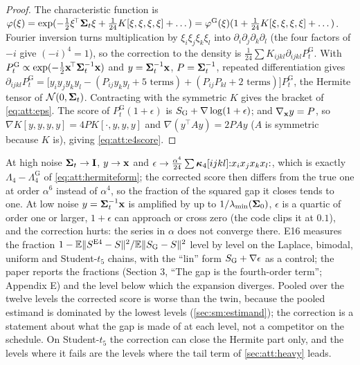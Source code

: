 \begin{proof}
The characteristic function is $\varphi(\xi)=\exp(-\tfrac12\xi^{\!\top}\mathbf{\Sigma}_t\xi+\tfrac1{24}K[\xi,\xi,\xi,\xi]+\dots)=\varphi^{\mathrm G}(\xi)(1+\tfrac1{24}K[\xi,\xi,\xi,\xi]+\dots)$.
Fourier inversion turns multiplication by $\xi_i\xi_j\xi_k\xi_l$ into
$\partial_i\partial_j\partial_k\partial_l$ (the four factors of $-i$ give $(-i)^4=1$), so
the correction to the density is $\tfrac1{24}\sum K_{ijkl}\partial_{ijkl}P^{\mathrm G}_t$.
With $P^{\mathrm G}_t\propto\exp(-\tfrac12\mathbf{x}^{\!\top}\mathbf{\Sigma}_t^{-1}\mathbf{x})$ and $y=\mathbf{\Sigma}_t^{-1}\mathbf{x}$,
$P=\mathbf{\Sigma}_t^{-1}$, repeated differentiation gives
$\partial_{ijkl}P^{\mathrm G}_t=\bigl[y_iy_jy_ky_l-(P_{ij}y_ky_l+\text{5 terms})+(P_{ij}P_{kl}+\text{2 terms})\bigr]P^{\mathrm G}_t$,
the Hermite tensor of $\mathcal{N}\!\left(0,\mathbf{\Sigma}_t\right)$. Contracting with the symmetric $K$ gives
the bracket of \cref{eq:att:eps}. The score of $P^{\mathrm G}_t(1+\epsilon)$ is
$S_{\mathrm{G}}+\nabla\log(1+\epsilon)$; and $\nabla_{\mathbf{x}}y=P$, so
$\nabla K[y,y,y,y]=4PK[\cdot,y,y,y]$ and $\nabla(y^{\!\top}Ay)=2PAy$ ($A$ is symmetric
because $K$ is), giving \cref{eq:att:e4score}.
\end{proof}

At high noise $\mathbf{\Sigma}_t\to\mathbf{I}$, $y\to\mathbf{x}$ and $\epsilon\to\tfrac{\alpha^4}{24}\sum\bm{\kappa}_4[ijkl]{:}x_ix_jx_kx_l{:}$,
which is exactly $\Lambda_4-\Lambda_4^{\mathrm G}$ of \cref{eq:att:hermiteform}; the
corrected score then differs from the true one at order $\alpha^6$ instead of
$\alpha^4$, so the fraction of the squared gap it closes tends to one. At low noise
$y=\mathbf{\Sigma}_t^{-1}\mathbf{x}$ is amplified by up to $1/\lambda_{\min}(\mathbf{\Sigma}_0)$, $\epsilon$ is a
quartic of order one or larger, $1+\epsilon$ can approach or cross zero (the code
clips it at $0.1$), and the correction hurts: the series in $\alpha$ does not converge
there. E16 measures the fraction $1-\mathbb{E}\lVert S^{\mathrm{E4}}-S\rVert^2/\mathbb{E}\lVert S_{\mathrm{G}}-S\rVert^2$
level by level on the Laplace, bimodal, uniform and Student-$t_5$ chains, with the
``lin'' form $S_{\mathrm{G}}+\nabla\epsilon$ as a control; the paper reports the fractions
(Section 3, ``The gap is the fourth-order term''; Appendix E) and the level below
which the expansion diverges. Pooled over the twelve levels the corrected score is
worse than the twin, because the pooled estimand is dominated by the lowest levels
(\cref{sec:sm:estimand}); the correction is a statement about what the gap is made of
at each level, not a competitor on the schedule. On Student-$t_5$ the correction can
close the Hermite part only, and the levels where it fails are the levels where the
tail term of \cref{sec:att:heavy} leads.

